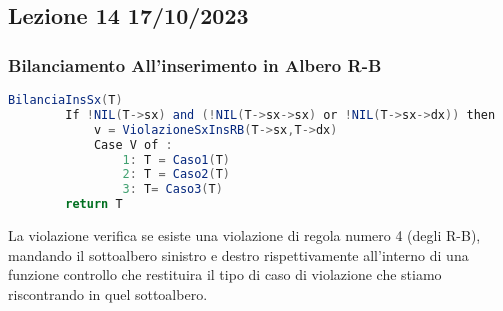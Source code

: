 \subsection{Lezione 14 17/10/2023}

\subsubsection{Bilanciamento All'inserimento in Albero R-B}

\begin{lstlisting}[language=Java]
	BilanciaInsSx(T)
		If !NIL(T->sx) and (!NIL(T->sx->sx) or !NIL(T->sx->dx)) then
			v = ViolazioneSxInsRB(T->sx,T->dx)
			Case V of :
				1: T = Caso1(T)
				2: T = Caso2(T)
				3: T= Caso3(T)
		return T
\end{lstlisting}

La violazione verifica se esiste una violazione di regola numero 4 (degli R-B), mandando il sottoalbero sinistro e destro rispettivamente all'interno di una funzione controllo che restituira il tipo di caso di violazione che stiamo riscontrando in quel sottoalbero.